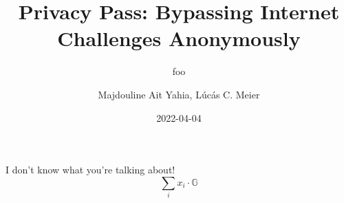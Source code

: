 \documentclass[12pt, a4paper]{article}
\date{2022-04-04}
\title{Privacy Pass: Bypassing Internet Challenges Anonymously}
\subtitle{foo}
\author{Majdouline Ait Yahia, Lúcás C. Meier}
\begin{document}
\maketitle

I don't know what you're talking about!
$$
\sum_i x_i \cdot \mathbb{G}
$$
\end{document}
